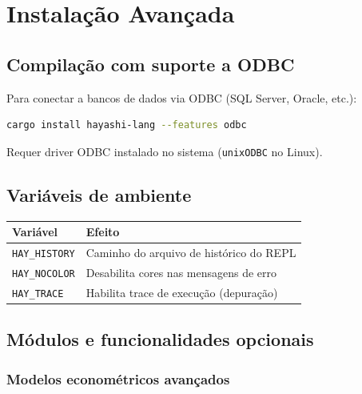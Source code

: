 \chapter{Instalação Avançada}
\label{apendice:instalacao}

\section{Compilação com suporte a ODBC}

Para conectar \hayashi{} a bancos de dados via ODBC (SQL Server, Oracle, etc.):

\begin{lstlisting}[style=inline, language=sh]
cargo install hayashi-lang --features odbc
\end{lstlisting}

Requer driver ODBC instalado no sistema (\texttt{unixODBC} no Linux).

\section{Variáveis de ambiente}

\begin{center}
\begin{tabular}{ll}
\toprule
\textbf{Variável} & \textbf{Efeito} \\
\midrule
\texttt{HAY\_HISTORY}  & Caminho do arquivo de histórico do REPL \\
\texttt{HAY\_NOCOLOR}  & Desabilita cores nas mensagens de erro \\
\texttt{HAY\_TRACE}    & Habilita trace de execução (depuração) \\
\bottomrule
\end{tabular}
\end{center}

\section{Módulos e funcionalidades opcionais}

\subsection*{Modelos econométricos avançados}

